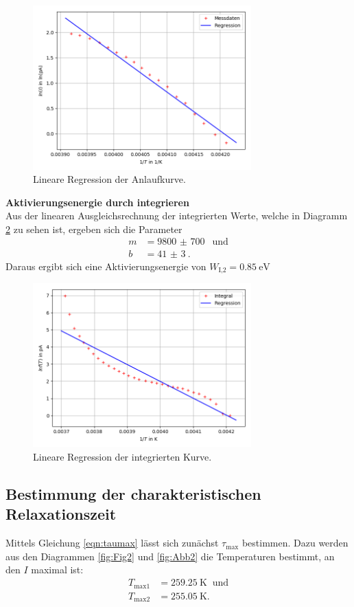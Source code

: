 \begin{figure}[H]
  \centering
  \includegraphics[width=0.75\textwidth]{Dipol2Anlauf.png}
  \caption{Lineare Regression der Anlaufkurve.}
  \label{fig:Abb3}
\end{figure}

\textbf{Aktivierungsenergie durch integrieren}\\
Aus der linearen Ausgleichsrechnung der integrierten Werte, welche in Diagramm \ref{fig:Abb4}
zu sehen ist, ergeben sich die Parameter
\begin{align}
  m&=\SI{9800(700)}{}\;\; \text{und}\\
  b&=\SI{41(3)}{}.
\end{align}
Daraus ergibt sich eine Aktivierungsenergie von $W_\text{I,2}=\SI{0,85}{\eV}$

\begin{figure}[H]
  \centering
  \includegraphics[width=0.75\textwidth]{Dipol2Integral.png}
  \caption{Lineare Regression der integrierten Kurve.}
  \label{fig:Abb4}
\end{figure}

\subsection{Bestimmung der charakteristischen Relaxationszeit}
Mittels Gleichung \ref{eqn:taumax} lässt sich zunächst $\tau_\text{max}$ bestimmen. Dazu
werden aus den Diagrammen \ref{fig:Fig2} und \ref{fig:Abb2} die Temperaturen bestimmt, an den $I$ maximal ist:
\begin{align*}
  T_\text{max1}&=\SI{259,25}{\K}\;\;\text{und}\\
  T_\text{max2}&=\SI{255,05}{\K}.
\end{align*}

